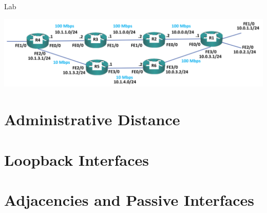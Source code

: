 \documentclass[pdflatex,compress,mathserif]{beamer}
\begin{document}
\begin{frame}{Lab}
	\begin{center}
		\includegraphics[width=\linewidth]{img/img27}
	\end{center}
\end{frame}

\section{Administrative Distance}

\section{Loopback Interfaces}

\section{Adjacencies and Passive Interfaces}
\end{document}
